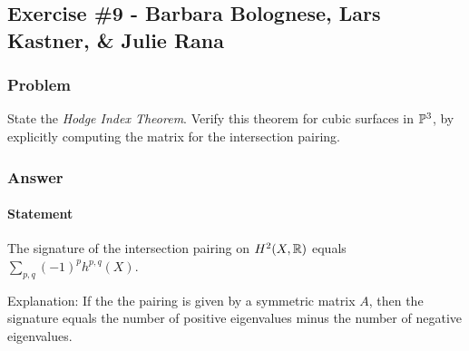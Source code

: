 \subsection{Exercise \#9 - Barbara Bolognese, Lars Kastner, \& Julie Rana}

\subsubsection{Problem}
State the \textit{Hodge Index Theorem}. Verify this theorem for cubic surfaces
in $\P^3$, by explicitly computing the matrix for the intersection pairing.


\subsubsection{Answer}

\paragraph{Statement}

\begin{theorem}
The signature of the intersection pairing on $H^2(X,\R)$ equals $\sum_{p,q}(-1)^ph^{p,q}(X)$.
\end{theorem}

Explanation: If the the pairing is given by a symmetric matrix $A$, then the
signature equals the number of positive eigenvalues minus the number of
negative eigenvalues.

